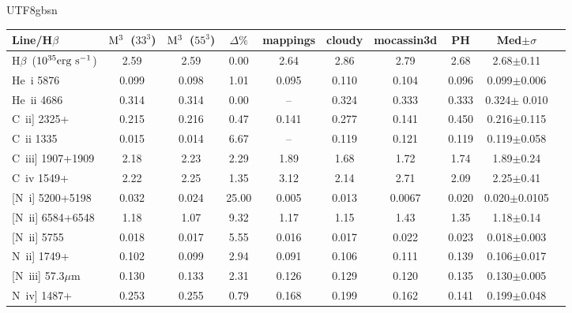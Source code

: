 \documentclass[twocolumn]{aastex62}
\newcommand{\hb}{H$\beta$}    %
\newcommand{\newcode}{{$\rm M^3$}}
\begin{document}
\begin{CJK*}{UTF8}{gbsn}
\begin{table*}
\begin{center}
\caption{Meudon/Lexington H~{\sc ii} Region Benchmark Results: PN150.}
\begin{minipage}{13.5cm}
\label{tab:PN150}
\begin{tabular}{@{}lccccccccc}
\hline
Line/\hb & \newcode\ ($33^3$) & \newcode\ ($55^3$) & $\Delta\%$ & {\sc mappings} & {\sc cloudy} & {\sc mocassin3d} & PH & Med$\pm\sigma$  \\
\hline
\hb\ ($\rm 10^{35}erg~s^{-1}$) & 2.59  & 2.59    &  0.00  & 2.64    & 2.86      & 2.79     & 2.68    &  2.68$\pm$0.11 \\
He~{\sc i} 5876                        & 0.099 & 0.098  &  1.01  & 0.095   & 0.110    & 0.104   & 0.096 & 0.099$\pm$0.006\\
He~{\sc ii} 4686                       & 0.314 & 0.314  &   0.00   & --         & 0.324    & 0.333   & 0.333  & 0.324$\pm$ 0.010\\
C~{\sc ii]} 2325+                      & 0.215 & 0.216  &   0.47   & 0.141  & 0.277    & 0.141   & 0.450  & 0.216$\pm$0.115\\
C~{\sc ii} 1335                         & 0.015 & 0.014  &  6.67    & --         & 0.119    & 0.121   & 0.119  &0.119$\pm$0.058\\
C~{\sc iii]} 1907+1909             & 2.18   & 2.23    &  2.29    & 1.89    & 1.68      & 1.72     & 1.74    &1.89$\pm$0.24\\
C~{\sc iv} 1549+                      & 2.22   & 2.25    &  1.35    & 3.12    & 2.14      & 2.71     & 2.09   & 2.25$\pm$0.41\\
{[N~\sc i]} 5200+5198              & 0.032 & 0.024  &  25.00    & 0.005  & 0.013    & 0.0067  & 0.020  & 0.020$\pm$0.0105\\
{[N~\sc ii]} 6584+6548             & 1.18   & 1.07    &   9.32    & 1.17    & 1.15      & 1.43      & 1.35  & 1.18$\pm$0.14\\
{[N~\sc ii]} 5755                       & 0.018 &  0.017 &   5.55   & 0.016  & 0.017    & 0.022    & 0.023  & 0.018$\pm$0.003\\
{N~\sc ii]} 1749+                      & 0.102 &  0.099 &   2.94   & 0.091  & 0.106    & 0.111    & 0.139   & 0.106$\pm$0.017\\
{[N~\sc iii]} 57.3$\mu$m          & 0.130 & 0.133  &   2.31   & 0.126  & 0.129    & 0.120    & 0.135  & 0.130$\pm$0.005\\
{N~\sc iv]} 1487+                     & 0.253 & 0.255  &  0.79    & 0.168  & 0.199    & 0.162    & 0.141  & 0.199$\pm$0.048\\

\end{tabular}
\end{minipage}
\end{center}
\end{table*}
\end{CJK*}
\end{document}
